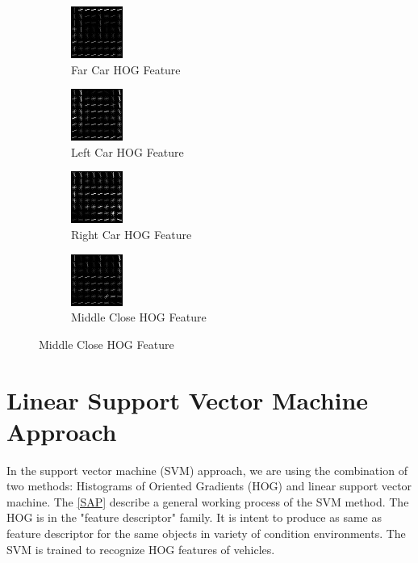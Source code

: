 \documentclass[conference]{IEEEtran}
\begin{document}
\begin{figure}[h]
	\centering
	\begin{subfigure}[t]{0.2\textwidth} 
		\centering
		\includegraphics[scale=0.8]{figures/hog_far.jpg}
		\caption{Far Car HOG Feature}
	\end{subfigure}%
	\begin{subfigure}[t]{0.2\textwidth} 
		\centering
		\includegraphics[scale=0.8]{figures/hog_left.jpg}
		\caption{Left Car HOG Feature}
	\end{subfigure}
	\begin{subfigure}[t]{0.2\textwidth} 
		\centering
		\includegraphics[scale=0.8]{figures/hog_right.jpg}
		\caption{Right Car HOG Feature}
	\end{subfigure} 
	\begin{subfigure}[t]{0.2\textwidth} 
		\centering
		\includegraphics[scale=0.8]{figures/hog_middle_close.jpg}
		\caption{Middle Close HOG Feature}
	\end{subfigure}%
\end{figure}

\section{Linear Support Vector Machine Approach}

In the support vector machine (SVM) approach, we are using the combination of two methods: Histograms of Oriented Gradients (HOG) and linear support vector machine. The \ref{SAP} describe a general working process of the SVM method. The HOG is in the "feature descriptor" family. It is intent to produce as same as feature descriptor for the same objects in variety of condition environments. The SVM is trained to recognize HOG features of vehicles.
\end{document}
